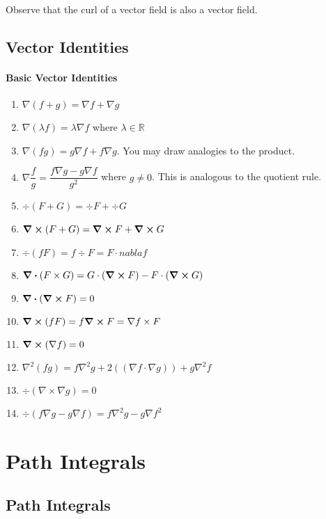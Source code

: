 \documentclass[12pt, letterpaper]{article}
\begin{document}
    Observe that the curl of a vector field is also a vector field.

    \subsection{Vector Identities}
    
    
    \paragraph{Basic Vector Identities}
    
    \begin{enumerate}
        \item \(\nabla(f + g) = \nabla f + \nabla g\)
        \item \(\nabla (\lambda f) = \lambda \nabla f\) where \(\lambda \in \mathbb{R}\)
        \item \(\nabla (fg) = g \nabla f + f \nabla g\). You may draw analogies to the product.
        \item \(\nabla \dfrac{f}{g} = \dfrac{f\nabla g - g\nabla f}{g^2}\) where \(g\neq 0\). This is analogous to the quotient rule.
        \item \(\div (F + G) = \div F + \div G\)
        \item \(\curl (F + G) = \curl F + \curl G\)
        \item \(\div (fF) = f\div F = F\cdot nabla f\)
        \item \(\div (F\times G) = G \cdot (\curl F) - F \cdot (\curl G)\)
        \item \(\div(\curl F) = 0\)
        \item \(\curl (fF) = f\curl F = \nabla f \times F\)
        \item  \(\curl (\nabla f) = 0\)
        \item \(\nabla^2 (fg) = f\nabla^2 g + 2((\nabla f \cdot \nabla g)) + g\nabla^2f\)
        \item \(\div (\nabla \times \nabla g) = 0\)
        \item \(\div(f\nabla g - g\nabla f) = f\nabla^2 g - g\nabla f^2\)
    \end{enumerate}
    

    \section{Path Integrals}

    \subsection{Path Integrals}
\end{document}
